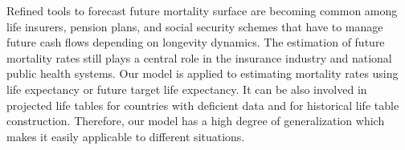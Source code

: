 \documentclass[a4,11pt]{article}
\begin{document}
Refined tools to forecast future mortality surface are becoming common among life insurers, pension plans, and social security schemes that have to manage future cash flows depending on longevity dynamics. The estimation of future mortality rates still plays a central role in the insurance industry and national public health systems. 
Our model is applied to estimating mortality rates using life expectancy or future target life expectancy. It can be also involved in projected life tables for countries with deficient data and for historical life table construction. Therefore, our model has a high degree of generalization which makes it easily applicable to different situations.



\end{document}

